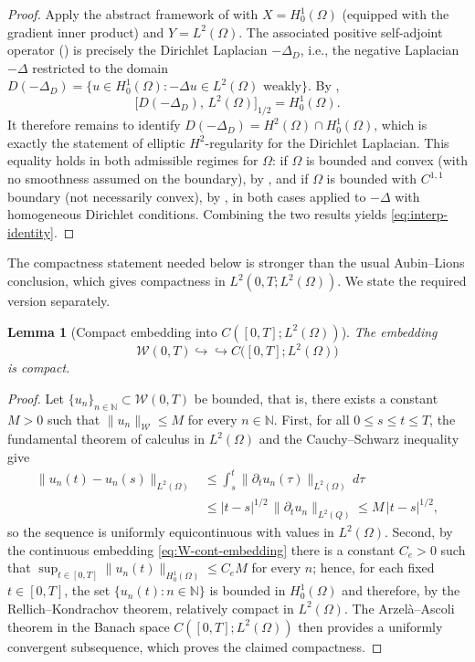 \documentclass[11pt]{elsarticle}
\newtheorem{lemma}[theorem]{Lemma}
\theoremstyle{definition}
\theoremstyle{remark}
\numberwithin{equation}{section}
\begin{document}
\begin{proof}
	Apply the abstract framework of
	\cite[Chapter~1, \S2.1]{LionsMagenes} with $X=H_0^1(\Omega)$
	(equipped with the gradient inner product) and $Y=L^2(\Omega)$. The
	associated positive self-adjoint operator
	(\cite[Chapter~1, \S2.1, eq.~(2.4)]{LionsMagenes}) is precisely the
	Dirichlet Laplacian $-\Delta_D$, i.e., the negative Laplacian $-\Delta$ 
	restricted to the domain $D(-\Delta_D)=\{u\in H_0^1(\Omega):-\Delta u\in L^2(\Omega)\text{ weakly}\}$. By
	\cite[Chapter~1, \S2.4, Proposition~2.1, eq.~(2.42)]{LionsMagenes},
	\[
	\bigl[D(-\Delta_D),\,L^2(\Omega)\bigr]_{1/2}=H_0^1(\Omega).
	\]
	It therefore remains to identify
	$D(-\Delta_D)=H^2(\Omega)\cap H_0^1(\Omega)$, which is exactly the
	statement of elliptic $H^2$-regularity for the Dirichlet Laplacian.
	This equality holds in both admissible regimes for $\Omega$:
	if $\Omega$ is bounded and convex (with no smoothness assumed on the
	boundary), by \cite[Theorem~3.2.1.2]{Grisvard1985}, and if $\Omega$
	is bounded with $C^{1,1}$ boundary (not necessarily convex), by
	\cite[Theorem~2.4.2.5]{Grisvard1985}, in both cases applied to
	$-\Delta$ with homogeneous Dirichlet conditions. Combining the two
	results yields \eqref{eq:interp-identity}.
\end{proof}

The compactness statement needed below is stronger than the usual
Aubin--Lions conclusion, which gives compactness in
$L^2(0,T;L^2(\Omega))$. We state the required version separately.

\begin{lemma}[{Compact embedding into $C([0,T];L^2(\Omega))$}]
	\label{lem:compact-embedding}
	The embedding
	\[
	\mathcal{W}(0,T)
	\hookrightarrow\hookrightarrow
	C\bigl([0,T];L^2(\Omega)\bigr)
	\]
	is compact.
\end{lemma}

\begin{proof}
	Let $\{u_n\}_{n\in\mathbb{N}}\subset\mathcal{W}(0,T)$ be bounded, that is,
	there exists a constant $M>0$ such that
	$\|u_n\|_{\mathcal{W}}\le M$ for every $n\in\mathbb{N}$. First, for all
	$0\le s\le t\le T$, the fundamental theorem of calculus in
	$L^2(\Omega)$ and the Cauchy--Schwarz inequality give
	\begin{align*}
	\|u_n(t)-u_n(s)\|_{L^2(\Omega)}
	& \le\int_s^t\|\partial_t u_n(\tau)\|_{L^2(\Omega)}\,d\tau
	\\	
	&\le|t-s|^{1/2}\,\|\partial_t u_n\|_{L^2(Q)}
	\le M\,|t-s|^{1/2},
	\end{align*}
	so the sequence is uniformly equicontinuous with values in
	$L^2(\Omega)$. Second, by the continuous embedding
	\eqref{eq:W-cont-embedding} there is a constant $C_e>0$ such that
	$\sup_{t\in[0,T]}\|u_n(t)\|_{H_0^1(\Omega)}\le C_eM$ for every $n$;
	hence, for each fixed $t\in[0,T]$, the set
	$\{u_n(t):n\in\mathbb{N}\}$ is bounded in $H_0^1(\Omega)$ and
	therefore, by the Rellich--Kondrachov theorem, relatively compact in
	$L^2(\Omega)$. The Arzel\`a--Ascoli theorem in the Banach space
	$C([0,T];L^2(\Omega))$ then provides a uniformly convergent
	subsequence, which proves the claimed compactness.
\end{proof}
\end{document}
